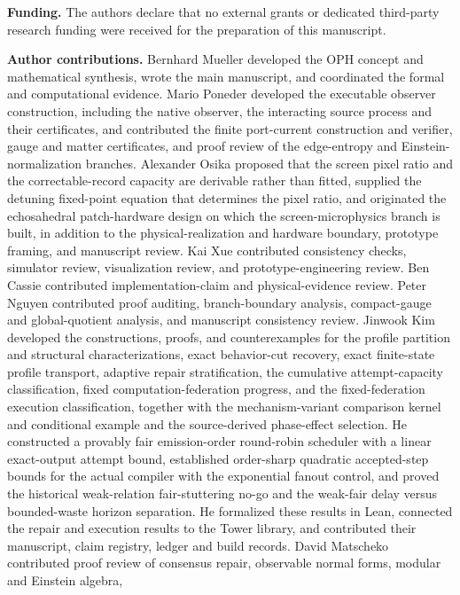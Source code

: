 \documentclass[11pt]{article}
\theoremstyle{definition}
\theoremstyle{remark}
\begin{document}
\noindent\textbf{Funding.}
The authors declare that no external grants or dedicated third-party research
funding were received for the preparation of this manuscript.

\noindent\textbf{Author contributions.}
Bernhard Mueller developed the OPH concept and mathematical synthesis, wrote
the main manuscript, and coordinated the formal and computational evidence.
Mario Poneder developed the
executable observer construction, including the native observer, the
interacting source process and their certificates, and contributed the
finite port-current construction and verifier, gauge and matter certificates,
and proof review of the edge-entropy and Einstein-normalization branches. Alexander Osika proposed that the screen pixel ratio and the
correctable-record capacity are derivable rather than fitted, supplied the
detuning fixed-point equation that determines the pixel ratio, and originated
the echosahedral patch-hardware design on which the screen-microphysics branch
is built, in addition to the physical-realization and hardware boundary,
prototype framing, and manuscript review. Kai
Xue contributed consistency checks, simulator review, visualization review,
and prototype-engineering review. Ben Cassie contributed implementation-claim
and physical-evidence review. Peter Nguyen contributed proof auditing,
branch-boundary analysis, compact-gauge and global-quotient analysis, and
manuscript consistency review. Jinwook Kim developed the constructions,
proofs, and counterexamples for the profile partition and structural
characterizations, exact behavior-cut recovery, exact finite-state profile
transport, adaptive repair stratification, the cumulative attempt-capacity
classification, fixed computation-federation progress, and the
fixed-federation execution classification, together with the
mechanism-variant comparison kernel and conditional example and the
source-derived phase-effect selection. He constructed a provably fair
emission-order round-robin scheduler with a linear exact-output attempt bound,
established order-sharp quadratic accepted-step bounds for the actual compiler
with the exponential fanout control, and proved the historical weak-relation
fair-stuttering no-go and the weak-fair delay versus bounded-waste horizon
separation. He formalized these results in Lean, connected the repair and
execution results to the Tower library, and contributed their manuscript, claim registry, ledger and build records. David Matscheko contributed proof review of
consensus repair, observable normal forms, modular and Einstein algebra,
\end{document}
